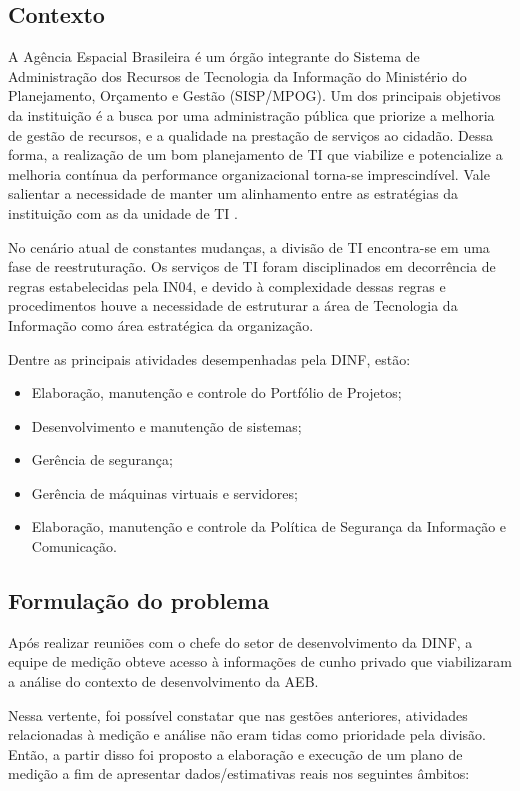 \subsection{Contexto}
	A Agência Espacial Brasileira é um órgão integrante do Sistema de Administração dos Recursos de Tecnologia da Informação do Ministério do Planejamento, Orçamento e Gestão (SISP/MPOG). Um dos principais objetivos da instituição é a busca por uma administração pública que priorize a melhoria de gestão de recursos, e a qualidade na prestação de serviços ao cidadão. Dessa forma, a realização de um bom planejamento de TI que viabilize e potencialize a melhoria contínua da performance organizacional torna-se imprescindível. Vale salientar a necessidade de manter um alinhamento entre as estratégias da instituição com as da unidade de TI \cite{PDTI}.

	No cenário atual de constantes mudanças, a divisão de TI encontra-se em uma fase de reestruturação. Os serviços de TI foram disciplinados em decorrência de regras estabelecidas pela IN04, e devido à complexidade dessas regras e procedimentos houve a necessidade de estruturar a área de Tecnologia da Informação como área estratégica da organização.

	Dentre as principais atividades desempenhadas pela DINF, estão:

	\begin{itemize}
		\item{Elaboração, manutenção e controle do Portfólio de Projetos;}
		\item{Desenvolvimento e manutenção de sistemas;}
		\item{Gerência de segurança;}
		\item{Gerência de máquinas virtuais e servidores;}
		\item{Elaboração, manutenção e controle da Política de Segurança da Informação e Comunicação.}
	\end{itemize}

\subsection{Formulação do problema}

	Após realizar reuniões com o chefe do setor de desenvolvimento da DINF, a equipe de medição obteve acesso à informações de cunho privado que viabilizaram a análise do contexto de desenvolvimento da AEB.

	Nessa vertente, foi possível constatar que nas gestões anteriores, atividades relacionadas à medição e análise não eram tidas como prioridade pela divisão. Então, a partir disso foi proposto a elaboração e execução de um plano de medição a fim de apresentar dados/estimativas reais nos seguintes âmbitos:

